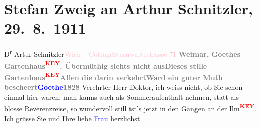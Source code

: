 

\renewcommand{\erwaehntePersonen}{Personen: Johann Wolfgang von Goethe, Olga Schnitzler, Stefan Zweig}
\renewcommand{\erwaehnteOrte}{Orte: Sternwartestraße 71, Weimar, Wien, Währinger Cottage}
\renewcommand{\erwaehnteWerke}{Werke: Die Hirtenflöte. Novelle}
\section[Stefan Zweig an Arthur Schnitzler, 29. 8. 1911]{Stefan Zweig an Arthur Schnitzler, 29. 8. 1911}
\nopagebreak{}
\rehead{ }\normalsize\beginnumbering{}
\toendnotes[C]{\smallbreak\pagebreak[2]}
\toendnotes[C]{\smallbreak}\pstart{}{\pb}D\textsuperscript{r}
                  Artur Schnitzler\pend{}\pstart{}\textcolor{pink}{Wien – Cottage}{}\ledrightnote{\textcolor{pink}{Währinger Cottage}}\pend{}\pstart{}\textcolor{pink}{Sternwartestrasse 71}{}\ledrightnote{\textcolor{pink}{Sternwartestraße 71}}\pend{}
{\bigskip}
\pstart
           \noindent{}{\pb}\textcolor{gray}{\textbf{Weimar, Goethes Gartenhaus\textcolor{red}{\textsuperscript{\textbf{KEY}}}.}}\pend
           \stanza{}\textcolor{gray}{\textbf{Übermüthig siehts nicht aus}}\textcolor{gray}{\textbf{Dieses stille Gartenhaus\textcolor{red}{\textsuperscript{\textbf{KEY}}}}}\textcolor{gray}{\textbf{Allen die darin verkehrt}}\textcolor{gray}{\textbf{Ward ein guter Muth bescheert}}\textcolor{gray}{\textbf{\textcolor{blue}{Goethe}{}\ledrightnote{\textcolor{blue}{Johann Wolfgang von Goethe}}{ }1828}}\stanzaend{}
\pstart
           \noindent{}{\pb}Verehrter Herr Doktor,
               ich weiss nicht, ob Sie schon einmal hier waren: man kanns auch als Sommeraufenthalt
               nehmen, statt als blosse Reverenzreise, so wundervoll still ist's jetzt in den Gängen
               an der Ilm\textcolor{red}{\textsuperscript{\textbf{KEY}}}. Ich grüsse Sie und Ihre liebe \textcolor{blue}{Frau}{}\ledrightnote{{$\rightarrow$}\textcolor{blue}{Olga Schnitzler}} herzlichst \pend
           

